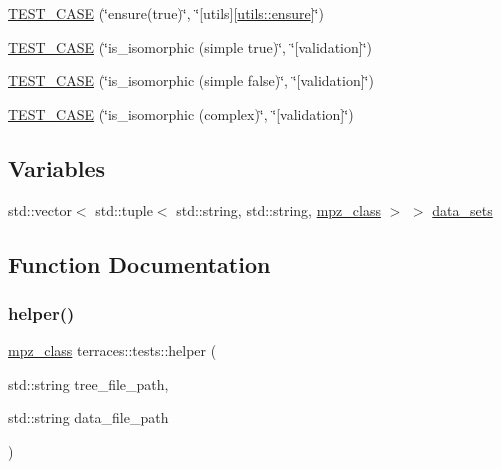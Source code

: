 \begin{DoxyCompactItemize}
\item 
\hyperlink{namespaceterraces_1_1tests_a5c2ab01fd890fe3a1b635a003a0924fe}{T\+E\+S\+T\+\_\+\+C\+A\+SE} (\char`\"{}ensure(true)\char`\"{}, \char`\"{}\mbox{[}utils\mbox{]}\mbox{[}\hyperlink{namespaceterraces_1_1utils_aae29deaf7ae1e950beddb248d2591ce2}{utils\+::ensure}\mbox{]}\char`\"{})
\item 
\hyperlink{namespaceterraces_1_1tests_ad56c940f333832b8ab78bb33d36c4db5}{T\+E\+S\+T\+\_\+\+C\+A\+SE} (\char`\"{}is\+\_\+isomorphic (simple true)\char`\"{}, \char`\"{}\mbox{[}validation\mbox{]}\char`\"{})
\item 
\hyperlink{namespaceterraces_1_1tests_ae3fa4664df0f853e61b4419383bcd749}{T\+E\+S\+T\+\_\+\+C\+A\+SE} (\char`\"{}is\+\_\+isomorphic (simple false)\char`\"{}, \char`\"{}\mbox{[}validation\mbox{]}\char`\"{})
\item 
\hyperlink{namespaceterraces_1_1tests_aeae228e072ad382f6df26d0551bafe00}{T\+E\+S\+T\+\_\+\+C\+A\+SE} (\char`\"{}is\+\_\+isomorphic (complex)\char`\"{}, \char`\"{}\mbox{[}validation\mbox{]}\char`\"{})
\end{DoxyCompactItemize}
\subsection*{Variables}
\begin{DoxyCompactItemize}
\item 
std\+::vector$<$ std\+::tuple$<$ std\+::string, std\+::string, \hyperlink{gmpxx_8h_a4194ba637e08ba88fb6b56747cc0ee6c}{mpz\+\_\+class} $>$ $>$ \hyperlink{namespaceterraces_1_1tests_a1ea2bfc31a1006c1da7a3b96372b008a}{data\+\_\+sets}
\end{DoxyCompactItemize}


\subsection{Function Documentation}
\mbox{\label{namespaceterraces_1_1tests_a740352dfa946b8680c3c25e0edbc87a9}} 
\subsubsection{\texorpdfstring{helper()}{helper()}}
{\footnotesize\ttfamily \hyperlink{gmpxx_8h_a4194ba637e08ba88fb6b56747cc0ee6c}{mpz\+\_\+class} terraces\+::tests\+::helper (\begin{DoxyParamCaption}\item[{std\+::string}]{tree\+\_\+file\+\_\+path,  }\item[{std\+::string}]{data\+\_\+file\+\_\+path }\end{DoxyParamCaption})}

